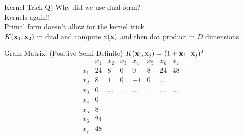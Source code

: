 \documentclass{beamer}
\begin{document}
\begin{frame}{Kernel Trick}
	   Q) Why did we use dual form? \\
	   \hspace{0.5cm} Kernels again!! \\
	   \vspace{1cm}
	   Primal form doesn't allow for the kernel trick \\
	   $K(\mathbf{x}_{1}, \mathbf{x}_{2})$ in dual and compute $\phi(\mathbf{x})$ and then dot product in $D$ dimensions
	\end{frame}
	\begin{frame}{Gram Matrix: (Positive Semi-Definite)}
	$K(\mathbf{x}_{i}, \mathbf{x}_{j}) = (1 + \mathbf{x}_{i} \cdot \mathbf{x}_{j})^{2}$ \\
	$$
	\begin{matrix}
	& x_{1} & x_{2} & x_{3} & x_{4} & x_{5} & x_{6} & x_{7} \\
	x_{1} & 24 & 8 & 0 & 0 & 8 & 24 & 48 \\
	x_{2} & 8 & 1 & 0 & -1 & 0 & \ldots & \\
	x_{3} & 0 & \ldots & \ldots & \ldots & \ldots & \ldots & \ldots \\
	x_{4} & 0 & & & & & & \\
	x_{5} & 8 & & & & & & \\
	x_{6} & 24 & & & & & & \\
	x_{7} & 48 & & & & & & \\
	\end{matrix}
	$$
	\end{frame}
\end{document}
